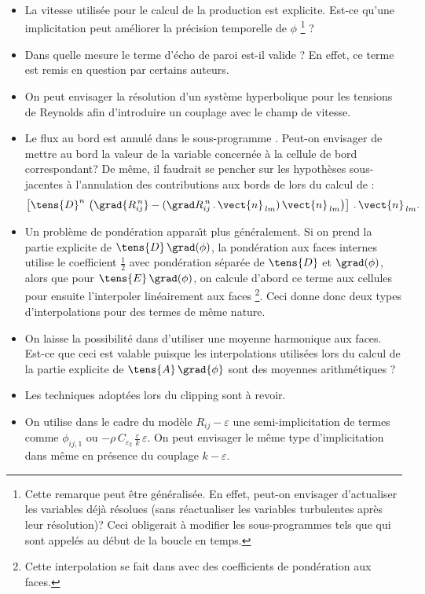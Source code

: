 \begin{itemize}
\item {La vitesse utilis\'ee pour le calcul de la production est explicite. Est-ce qu'une implicitation peut am\'eliorer la pr\'ecision temporelle de $\phi$ \footnote{Cette remarque peut \^etre g\'en\'eralis\'ee. En effet, peut-on envisager d'actualiser les variables d\'ej\`a r\'esolues (sans r\'eactualiser les variables turbulentes apr\`es leur r\'esolution)? Ceci obligerait \`a modifier les sous-programmes tels que  qui sont appel\'es au d\'ebut de la boucle en temps.} ?}
\item {Dans quelle mesure le terme d'\'echo de paroi est-il valide ? En effet, ce terme est remis en question par certains auteurs.}
\item {On peut envisager la r\'esolution d'un syst\`eme hyperbolique pour les
tensions de Reynolds afin d'introduire un couplage avec le champ de vitesse.}
\item {Le flux au bord  est annul\'e dans le sous-programme
. Peut-on envisager de mettre au bord la valeur de la variable
concern\'ee \`a la cellule de bord correspondant? De m\^eme, il faudrait se
pencher sur les hypoth\`eses sous-jacentes \`a l'annulation des contributions
aux bords de  lors du calcul de : $$\left[ \tens{D}^n\,\left( \grad{R^{\,n}_{ij}} - (\grad R^{\,n}_{ij}\,.\,\vect{n}_{\,lm})\,\vect{n}_{\,lm}\right) \right]\,.\,\vect{n}_{\,lm}.$$}
\item {Un probl\`eme de pond\'eration appara\^\i t plus g\'en\'eralement. Si on prend la partie explicite de $\tens{D}\,\grad(\phi)$, la pond\'eration aux faces internes utilise le coefficient $\displaystyle\frac{1}{2}$ avec pond\'eration s\'epar\'ee de $\tens{D}$ et $\grad(\phi)$, alors que pour $\tens{E}\,\grad(\phi)$, on calcule d'abord ce terme aux cellules pour ensuite l'interpoler lin\'eairement aux faces \footnote{Cette interpolation se fait dans  avec des coefficients de pond\'eration aux faces.}. Ceci donne donc deux types d'interpolations pour des termes de m\^eme nature.}
\item {On laisse la possibilit\'e dans  d'utiliser une moyenne
harmonique aux faces. Est-ce que ceci est valable puisque les interpolations
utilis\'ees lors du calcul de la partie explicite de $\tens{A}\,\grad{\phi}$
sont des moyennes arithm\'etiques ?}
\item {Les techniques adopt\'ees lors du clipping sont \`a revoir.}
\item {On utilise dans le cadre du mod\`ele $\displaystyle R_{ij}-\varepsilon $ une semi-implicitation de termes comme $\displaystyle \phi_{ij,1}$ ou $\displaystyle -\rho\,C_{\varepsilon_2}\,\frac{\varepsilon}{k}\,\varepsilon$. On peut envisager le m\^eme type d'implicitation dans  m\^eme en pr\'esence du couplage $\displaystyle k-\varepsilon$.}

\end{itemize}
